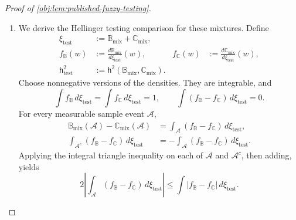 \begin{proof}[Proof of \cref{obj:lem:published-fuzzy-testing}]
\begin{enumerate}
\item We derive the Hellinger testing comparison for these mixtures. Define
\[
\begin{aligned}
\xi_{\mathrm{test}}&:=\mathbb B_{\mathrm{mix}}+\mathbb C_{\mathrm{mix}},\\
f_{\mathbb B}(w)&:=\frac{d\mathbb B_{\mathrm{mix}}}{d\xi_{\mathrm{test}}}(w),
&
f_{\mathbb C}(w)&:=\frac{d\mathbb C_{\mathrm{mix}}}{d\xi_{\mathrm{test}}}(w),\\
\mathsf h_{\mathrm{test}}^2
&:=\mathsf h^2(\mathbb B_{\mathrm{mix}},\mathbb C_{\mathrm{mix}}).
\end{aligned}
\]
Choose nonnegative versions of the densities. They are integrable, and
\[
\int f_{\mathbb B}\,d\xi_{\mathrm{test}}
=\int f_{\mathbb C}\,d\xi_{\mathrm{test}}=1,
\qquad
\int(f_{\mathbb B}-f_{\mathbb C})\,d\xi_{\mathrm{test}}=0.
\]
For every measurable sample event \(\mathcal A\),
\[
\begin{aligned}
\mathbb B_{\mathrm{mix}}(\mathcal A)
-\mathbb C_{\mathrm{mix}}(\mathcal A)
&=\int_{\mathcal A}(f_{\mathbb B}-f_{\mathbb C})\,d\xi_{\mathrm{test}},\\
\int_{\mathcal A^c}(f_{\mathbb B}-f_{\mathbb C})\,d\xi_{\mathrm{test}}
&=-\int_{\mathcal A}(f_{\mathbb B}-f_{\mathbb C})\,d\xi_{\mathrm{test}}.
\end{aligned}
\]
Applying the integral triangle inequality on each of \(\mathcal A\) and
\(\mathcal A^c\), then adding, yields
\[
2\left|
\int_{\mathcal A}(f_{\mathbb B}-f_{\mathbb C})\,d\xi_{\mathrm{test}}
\right|
\le
\int|f_{\mathbb B}-f_{\mathbb C}|\,d\xi_{\mathrm{test}}.
\]


\end{enumerate}
\end{proof}
